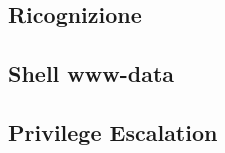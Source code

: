 \begin{cvletter}
\subsection{Ricognizione}
\subsection{Shell www-data}
\subsection{Privilege Escalation}
   


\end{cvletter}
